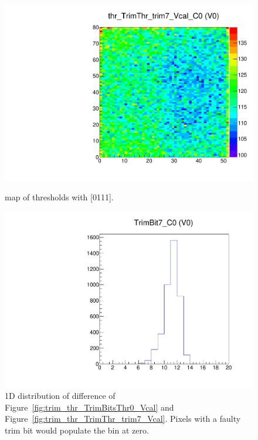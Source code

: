 \begin{figure}[!htp]
\centering
\begin{minipage}{0.45\textwidth}
  \includegraphics[width=1.0\textwidth]{figures/trim_thr_TrimThr_trim7_Vcal.pdf}
  \caption{\roc map of \vcal thresholds with  [0111].}
  \label{fig:trim_thr_TrimThr_trim7_Vcal}
\end{minipage}
\hspace{0.3cm}
\begin{minipage}{0.45\textwidth}
  \includegraphics[width=1.0\textwidth]{figures/trim_TrimBit7.pdf}
  \caption{1D distribution of difference of Figure~\ref{fig:trim_thr_TrimBitsThr0_Vcal} and Figure~\ref{fig:trim_thr_TrimThr_trim7_Vcal}.
           Pixels with a faulty trim bit would populate the bin at zero.}
  \label{fig:trim_TrimBit7}
\end{minipage}
\end{figure}

